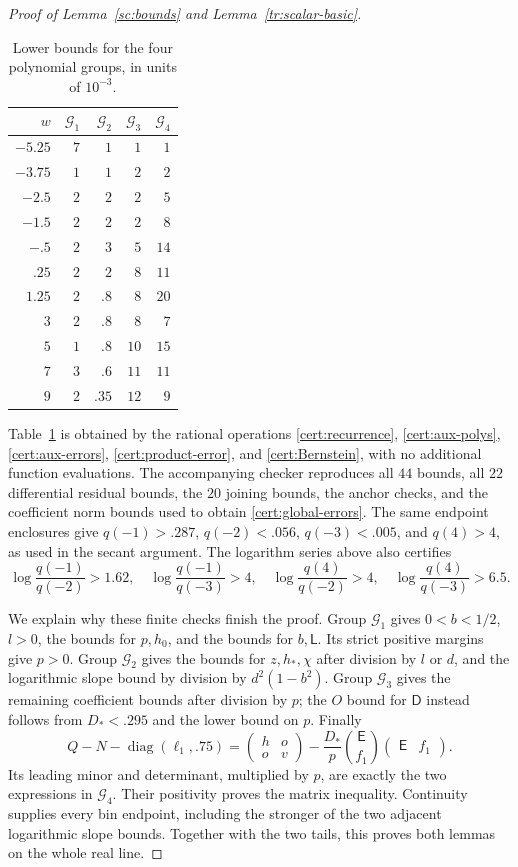 \documentclass[11pt]{article}
\theoremstyle{definition}
\theoremstyle{remark}
\numberwithin{equation}{section}
\begin{document}
\begin{proof}[Proof of Lemma~\ref{sc:bounds} and Lemma~\ref{tr:scalar-basic}]
\begin{table}[htbp]
\caption{Lower bounds for the four polynomial groups, in units of $10^{-3}$.}
\label{cert:group-bounds}
\begin{tabular}{r r r r r}
\hline
$w$&$\mathcal G_1$&$\mathcal G_2$&$\mathcal G_3$&$\mathcal G_4$\\\hline
$-5.25$&$7$&$1$&$1$&$1$\\
$-3.75$&$1$&$1$&$2$&$2$\\
$-2.5$&$2$&$2$&$2$&$5$\\
$-1.5$&$2$&$2$&$2$&$8$\\
$-.5$&$2$&$3$&$5$&$14$\\
$.25$&$2$&$2$&$8$&$11$\\
$1.25$&$2$&$.8$&$8$&$20$\\
$3$&$2$&$.8$&$8$&$7$\\
$5$&$1$&$.8$&$10$&$15$\\
$7$&$3$&$.6$&$11$&$11$\\
$9$&$2$&$.35$&$12$&$9$\\\hline
\end{tabular}
\end{table}

Table~\ref{cert:group-bounds} is obtained by the rational operations
\eqref{cert:recurrence}, \eqref{cert:aux-polys},
\eqref{cert:aux-errors}, \eqref{cert:product-error}, and
\eqref{cert:Bernstein}, with no additional function evaluations.
The accompanying checker reproduces all $44$ bounds, all $22$
differential residual bounds, the $20$ joining bounds, the anchor checks,
and the coefficient norm bounds used to obtain
\eqref{cert:global-errors}. The same endpoint enclosures give
$q(-1)>.287$, $q(-2)<.056$, $q(-3)<.005$, and $q(4)>4$, as used
in the secant argument. The logarithm series above also certifies
\[
 \log\frac{q(-1)}{q(-2)}>1.62,\quad
 \log\frac{q(-1)}{q(-3)}>4,\quad
 \log\frac{q(4)}{q(-2)}>4,\quad
 \log\frac{q(4)}{q(-3)}>6.5.
\]

We explain why these finite checks finish the proof. Group $\mathcal G_1$
gives $0<b<1/2$, $l>0$, the bounds for $p,h_0$, and the bounds for
$b,\mathsf L$. Its strict positive margins give $p>0$.
Group $\mathcal G_2$ gives the bounds for $z,h_*,\chi$ after division by
$l$ or $d$, and the logarithmic slope bound by division by
$d^2(1-b^2)$. Group $\mathcal G_3$ gives the remaining coefficient bounds
after division by $p$; the $O$ bound for $\mathsf D$ instead follows from
$D_*<.295$ and the lower bound on $p$.
Finally
\[
 Q-N-\operatorname{diag}(\ell_1,.75)
 =\begin{pmatrix}h&o\\o&v\end{pmatrix}
     -\frac{D_*}{p}\binom{\mathsf E}{f_1}
                             \begin{pmatrix}\mathsf E&f_1\end{pmatrix}.
\]
Its leading minor and determinant, multiplied by $p$, are exactly the
two expressions in $\mathcal G_4$. Their positivity proves the matrix
inequality. Continuity supplies every bin endpoint, including the stronger
of the two adjacent logarithmic slope bounds. Together with the two tails,
this proves both lemmas on the whole real line.
\end{proof}



\end{document}

